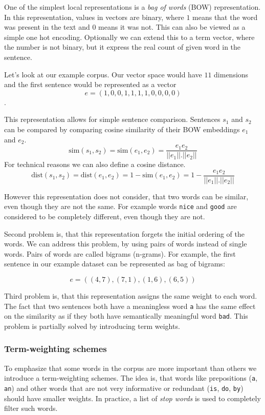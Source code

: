     One of the simplest local representations is a \textit{bag of words} (BOW) representation. 
    In this representation, values in vectors are binary, where $1$ means that the word was present in the text and $0$ means it was not.
    This can also be viewed as a simple one hot encoding.
    Optionally we can extend this to a term vector, where the number is not binary, but it express the real count of given word in the sentence.
    
    Let's look at our example corpus. 
    Our vector space would have $11$ dimensions and the first sentence would be represented as a vector
    $$e = (1, 0, 0, 1, 1, 1, 1, 0, 0, 0, 0)$$.
    
    This representation allows for simple sentence comparison. 
    Sentences $s_1$ and $s_2$ can be compared by comparing cosine similarity of their BOW embeddings $e_1$ and $e_2$.
    $$\mathrm{sim}(s_1, s_2) = \mathrm{sim}(e_1, e_2) = \frac{e_1 e_2}{||e_1||.||e_2||}$$
    For technical reasons we can also define a cosine distance. 
    $$\mathrm{dist}(s_1, s_2) = \mathrm{dist}(e_1, e_2) = 1- \mathrm{sim}(e_1, e_2) = 1 - \frac{e_1 e_2}{||e_1||.||e_2||}$$
    
    However this representation does not consider, that two words can be similar, even though they are not the same.
    For example words \texttt{nice} and \texttt{good} are considered to be completely different, even though they are not. 
    
    Second problem is, that this representation forgets the initial ordering of the words.
    We can address this problem, by using pairs of words instead of single words. 
    Pairs of words are called bigrams (n-grams).
    For example, the first sentence in our example dataset can be represented as bag of bigrams:
    
    $$e = ((4,7),(7,1),(1,6),(6,5))$$
    
    Third problem is, that this representation assigns the same weight to each word.
    The fact that two sentences both have a meaningless word \texttt{a} has the same effect on the similarity as if they both have semantically meaningful word \texttt{bad}. 
    This problem is partially solved by introducing term weights.
    
    
    \subsubsection{Term-weighting schemes}
    
    To emphasize that some words in the corpus are more important than others we introduce a term-weighting schemes. 
    The idea is, that words like prepositions (\texttt{a}, \texttt{an}) and other words that are not very informative or redundant (\texttt{is}, \texttt{do}, \texttt{by}) should have smaller weights. 
    In practice, a list of \textit{stop words} is used to completely filter such words.
    
